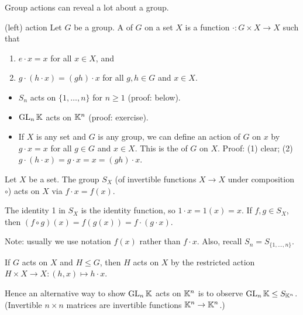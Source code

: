 \documentclass[12pt,letterpaper]{report}
\begin{document}
Group actions can reveal a lot about a group.

\begin{defn}{(left) action}{}
  Let $G$ be a group.
  A  of $G$ on a set $X$ is a function $\cdot \colon G \times X \to X$ such
  that
  \begin{enumerate}
    \item $e \cdot x = x$ for all $x \in X$, and
    \item $g \cdot (h \cdot x) = (gh) \cdot x$ for all $g, h \in G$ and $x \in X$.
  \end{enumerate}
\end{defn}

\begin{ex}
  \begin{itemize}
    \item $S_n$ acts on $\{1, \ldots, n\}$ for $n \geq 1$ (proof: below).
    \item $\operatorname{GL}_n\mathbb{K}$ acts on $\mathbb{K}^n$ (proof: exercise).
    \item If $X$ is any set and $G$ is any group, we can define an action of $G$ on $x$ by
      $g \cdot x = x$ for all $g \in G$ and $x \in X$.
      This is the  of $G$ on $X$.
      Proof: (1) clear; (2) $g \cdot (h \cdot x) = g \cdot x = x = (gh) \cdot x$.
  \end{itemize}
\end{ex}

\begin{prop}{}{}
  Let $X$ be a set.
  The group $S_X$ (of invertible functions $X \to X$ under composition $\circ$) acts on $X$
  via $f \cdot x = f(x)$.
\end{prop}

\begin{thmproof}
  The identity 1 in $S_X$ is the identity function, so $1 \cdot x = 1(x) = x$.
  If $f, g \in S_X$, then $(f \circ g)(x) = f(g(x)) = f \cdot (g \cdot x)$.
\end{thmproof}

Note: usually we use notation $f(x)$ rather than $f \cdot x$.
Also, recall $S_n = S_{\{1, \ldots, n\}}$.

\begin{lem}{}{}
  If $G$ acts on $X$ and $H \leq G$, then $H$ acts on $X$ by the restricted action
  $H \times X \to X : (h, x) \mapsto h \cdot x$.
\end{lem}

Hence an alternative way to show $\operatorname{GL}_n\mathbb{K}$ acts on $\mathbb{K}^n$ is to observe
$\operatorname{GL}_n\mathbb{K} \leq S_{\mathbb{K}^n}$.
(Invertible $n \times n$ matrices are invertible functions $\mathbb{K}^n \to \mathbb{K}^n$.)
\end{document}
